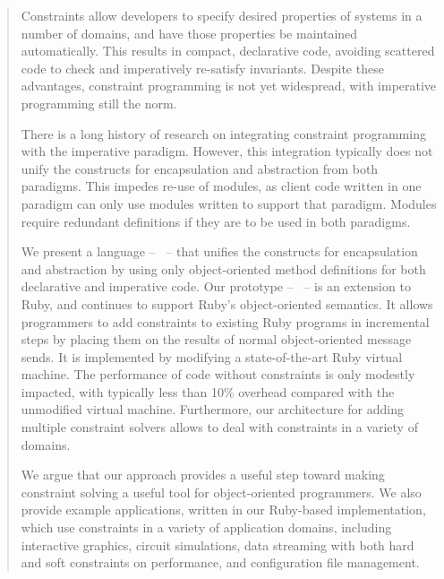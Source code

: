 \begin{abstract}
  Constraints allow developers to specify desired properties of
  systems in a number of domains, and have those properties be
  maintained automatically.  This results in compact, declarative
  code, avoiding scattered code to check and imperatively re-satisfy
  invariants.  Despite these advantages, constraint programming is not
  yet widespread, with imperative programming still the norm.

  There is a long history of research on integrating
  constraint programming with the imperative
  paradigm. However, this integration typically does not unify the
  constructs for encapsulation and abstraction from both
  paradigms. This impedes re-use of modules, as client code written in
  one paradigm can only use modules written to support that
  paradigm. Modules require redundant definitions if they are to be
  used in both paradigms.

  We present a language -- \langname~-- that unifies the constructs
  for encapsulation and abstraction
  by using only object-oriented method definitions
  for both declarative and imperative code. Our prototype --
  \toolname~-- is an extension to Ruby, and continues to support
  Ruby's object-oriented semantics.  It allows
  programmers to add constraints to existing Ruby programs in
  incremental steps by placing them on the results of normal
  object-oriented message sends.  It is implemented by modifying
  a state-of-the-art Ruby virtual machine.  The performance of 
  \DIFdelbegin {}\DIFdelend \DIFaddbegin {}\DIFaddend code without constraints is only modestly impacted,
  with typically less than 10\% overhead compared with the unmodified
  virtual machine. Furthermore, our architecture for adding multiple
  constraint solvers allows \langname to deal with constraints in a
  variety of domains.

  We argue that our approach provides a useful step toward making
  constraint solving a useful tool for object-oriented programmers.
  We also provide example applications, written in our Ruby-based
  implementation, which use constraints in a variety of application
  domains, including interactive graphics, circuit simulations, data
  streaming with both hard and soft constraints on performance, and
  configuration file management.



\end{abstract}
